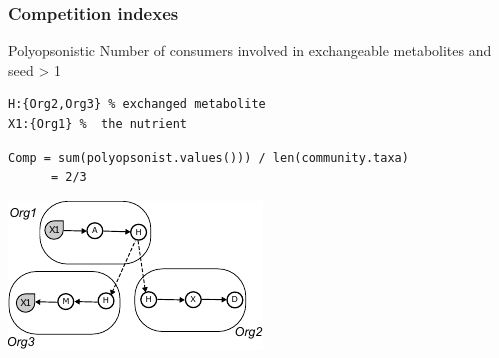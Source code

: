 \documentclass[8pt,usenames,dvipsnames]{beamer}
\begin{document}
\begin{frame}[fragile]
\frametitle{Competition  indexes}
\begin{minipage}{0.5\textwidth}

\begin{exampleblock}{Polyopsonistic}
Number of consumers involved in exchangeable metabolites and seed > 1
\end{exampleblock}{}

\begin{lstlisting}[mathescape=True]
H:{Org2,Org3} % exchanged metabolite
X1:{Org1} %  the nutrient
\end{lstlisting}

\begin{lstlisting}[mathescape=True]
 Comp = sum(polyopsonist.values())) / len(community.taxa)
      = 2/3
\end{lstlisting}

%

\end{minipage}%
\hspace{0.5cm}
\hfill
\begin{minipage}{0.4\textwidth}
\includegraphics[width=\textwidth]{figures/exchanged.pdf}
\end{minipage}


\end{frame}
\end{document}
